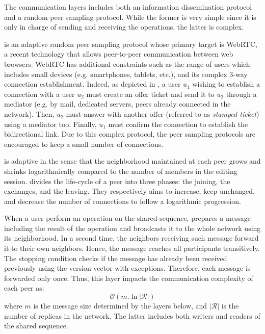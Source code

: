 \begin{asparadesc}
\item [The communication layers] includes both an information dissemination
  protocol and a random peer sampling protocol. While the former is very simple
  since it is only in charge of sending and receiving the operations, the latter
  is complex.

  \SPRAY is an adaptive random peer sampling protocol whose primary target is
  WebRTC, a recent technology that allows peer-to-peer communication between web
  browsers. WebRTC has additional constraints such as the range of users which
  includes small devices (e.g. smartphones, tablets, etc.), and its complex
  3-way connection establishment. Indeed, as depicted in , a user
  $u_1$ wishing to establish a connection with a user $u_2$ must create an offer
  ticket and send it to $u_2$ through a mediator (e.g. by mail, dedicated
  servers, peers already connected in the network). Then, $u_2$ must answer with
  another offer (referred to as \emph{stamped ticket}) using a mediator
  too. Finally, $u_1$ must confirm the connection to establish the bidirectional
  link. Due to this complex protocol, the peer sampling protocols are encouraged
  to keep a small number of connections.

  \SPRAY is adaptive in the sense that the neighborhood maintained at each peer
  grows and shrinks logarithmically compared to the number of members in the
  editing session. \SPRAY divides the life-cycle of a peer into three phases:
  the joining, the exchanges, and the leaving. They respectively aims to
  increase, keep unchanged, and decrease the number of connections to follow a
  logarithmic progression.
  
  When a user perform an operation on the shared sequence, \CRATE prepares a
  message including the result of the operation and broadcasts it to the whole
  network using its neighborhood. In a second time, the neighbors receiving such
  message forward it to their own neighbors. Hence, the message reaches all
  participants transitively. The stopping condition checks if the message has
  already been received previously using the version vector with
  exceptions. Therefore, each message is forwarded only once. Thus, this layer
  impacts the communication complexity of each peer as:
  \begin{equation}
    \mathcal{O}(m.\ln |\mathcal{R}| )
  \end{equation}
  where $m$ is the message size determined by the layers below, and
  $|\mathcal{R}|$ is the number of replicas in the network. The latter includes
  both writers and readers of the shared sequence.
  

\end{asparadesc}
